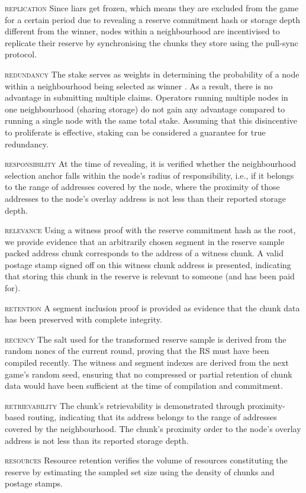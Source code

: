 \begin{labelledlist}
    \item[\textsc{replication}] Since liars get frozen, which means they are excluded from the game for a certain period due to revealing a reserve commitment hash or storage depth different from the winner, nodes within a neighbourhood are incentivised to replicate their reserve by synchronising the chunks they store using the pull-sync protocol.
%
\item[\textsc{redundancy}] The stake serves as weights in determining the probability of a node within a neighbourhood being selected as winner%
. As a result, there is no advantage in submitting multiple claims. Operators running multiple nodes in one neighbourhood (sharing storage) do not gain any advantage compared to running a single node with the same total stake. Assuming that this disincentive to proliferate is effective, staking can be considered a guarantee for true redundancy.
%
\item[\textsc{responsibility}]   At the time of revealing, it is verified whether the neighbourhood selection anchor falls within the node's radius of responsibility, i.e., if it belongs to the range of addresses covered by the node, where the proximity of those addresses to the node's overlay address is not less than their reported storage depth. 
%
\item[\textsc{relevance}]  Using a witness proof with the reserve commitment hash as the root, we provide evidence that an arbitrarily chosen segment in the reserve sample packed address chunk corresponds to the address of a witness chunk. 
A valid postage stamp signed off on this witness chunk address is presented, indicating that storing this chunk in the reserve is relevant to someone (and has been paid for). 
\item[\textsc{retention}] A segment inclusion proof is provided as evidence that the chunk data has been preserved with complete integrity. 
\item[\textsc{recency}]  The salt used for the transformed reserve sample is derived from the random noncs of the current round, proving that the RS must have been compiled recently. The witness and segment indexes are derived from the next game's random seed, ensuring that no compressed or partial retention of chunk data would have been
sufficient at the time of compilation and commitment.
\item[\textsc{retrievability}] The chunk's retrievability is demonstrated through proximity-based routing, indicating that its address belongs to the range of addresses covered by the neighbourhood. The chunk's proximity order to the node's overlay address is not less than its reported storage depth. 
\item[\textsc{resources}] Resource retention verifies the volume of resources constituting the reserve by estimating the sampled set size using the density of chunks and postage stamps. 
\end{labelledlist}
